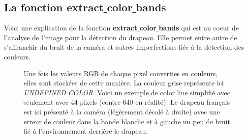 \documentclass{article}
\begin{document}
    \subsection{La fonction extract$\_$color$\_$bands}
    \label{extract_color_bands}
    Voici une explication de la fonction \textbf{extract$\_$color$\_$bands} qui est au coeur de l'analyse de l'image pour la détection du drapeau. Elle permet entre autre de s'affranchir du bruit de la caméra et autres imperfections liée à la détection des couleurs.
    \label{color_line_step1}
    \begin{figure}[!h] %
        \begin{center}
        \end{center}
        \caption{Une fois les valeurs RGB de chaque pixel converties en couleurs, elles sont stockées de cette manière. La couleur grise représente ici \textit{UNDEFINED$\_$COLOR}. Voici un exemple de \textcolor{bleu}{color$\_$line} simplifié avec seulement avec 44 pixels (contre 640 en réalité). Le drapeau français est ici présenté à la caméra (légèrement décalé à droite) avec une erreur de couleur dans la bande blanche et à gauche un peu de bruit lié à l'environnement derrière le drapeau.}
    \end{figure}
\end{document}
